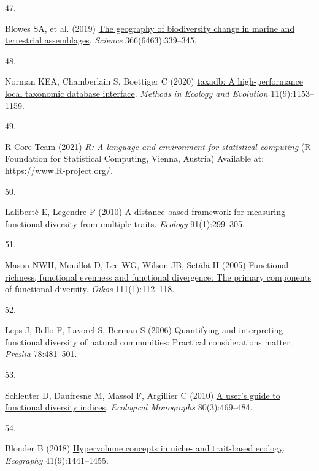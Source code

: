 \documentclass{article}
\newlength{\cslhangindent}
\newlength{\csllabelwidth}
\newlength{\cslentryspacingunit} %
\newenvironment{CSLReferences}[2] %
 {%
  \setlength{\parindent}{0pt}
  \ifodd #1
  \let\oldpar\par
  \def\par{\hangindent=\cslhangindent\oldpar}
  \fi
  \setlength{\parskip}{#2\cslentryspacingunit}
 }%
 {}
\newcommand{\CSLLeftMargin}[1]{\parbox[t]{\csllabelwidth}{#1}}
\newcommand{\CSLRightInline}[1]{\parbox[t]{\linewidth - \csllabelwidth}{#1}\break}
\begin{document}
\begin{CSLReferences}{0}{0}
\leavevmode{}%
\CSLLeftMargin{47. }%
\CSLRightInline{Blowes SA, et al. (2019)
\href{https://doi.org/10.1126/science.aaw1620}{The geography of
biodiversity change in marine and terrestrial assemblages}.
\emph{Science} 366(6463):339--345.}

\leavevmode{}%
\CSLLeftMargin{48. }%
\CSLRightInline{Norman KEA, Chamberlain S, Boettiger C (2020)
\href{https://doi.org/10.1111/2041-210X.13440}{taxadb: A
high-performance local taxonomic database interface}. \emph{Methods in
Ecology and Evolution} 11(9):1153--1159.}

\leavevmode{}%
\CSLLeftMargin{49. }%
\CSLRightInline{R Core Team (2021) \emph{R: A language and environment
for statistical computing} (R Foundation for Statistical Computing,
Vienna, Austria) Available at: \url{https://www.R-project.org/}.}

\leavevmode{}%
\CSLLeftMargin{50. }%
\CSLRightInline{Laliberté E, Legendre P (2010)
\href{https://doi.org/10.1890/08-2244.1}{A distance-based framework for
measuring functional diversity from multiple traits}. \emph{Ecology}
91(1):299--305.}

\leavevmode{}%
\CSLLeftMargin{51. }%
\CSLRightInline{Mason NWH, Mouillot D, Lee WG, Wilson JB, Setälä H
(2005) \href{http://www.jstor.org/stable/3548774}{Functional richness,
functional evenness and functional divergence: The primary components of
functional diversity}. \emph{Oikos} 111(1):112--118.}

\leavevmode{}%
\CSLLeftMargin{52. }%
\CSLRightInline{Leps J, Bello F, Lavorel S, Berman S (2006) Quantifying
and interpreting functional diversity of natural communities: Practical
considerations matter. \emph{Preslia} 78:481--501.}

\leavevmode{}%
\CSLLeftMargin{53. }%
\CSLRightInline{Schleuter D, Daufresne M, Massol F, Argillier C (2010)
\href{https://doi.org/10.1890/08-2225.1}{A user's guide to functional
diversity indices}. \emph{Ecological Monographs} 80(3):469--484.}

\leavevmode{}%
\CSLLeftMargin{54. }%
\CSLRightInline{Blonder B (2018)
\href{https://doi.org/10.1111/ecog.03187}{Hypervolume concepts in niche-
and trait-based ecology}. \emph{Ecography} 41(9):1441--1455.}


\end{CSLReferences}
\end{document}
